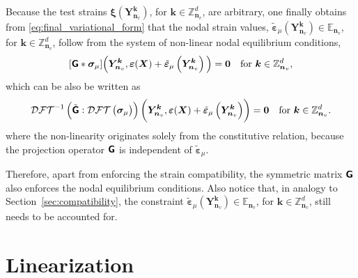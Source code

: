 Because the test strains \(\bm \xi(\bm Y_{\bm n_v}^{\bm k})\), for \(\bm k\in \mathbb Z^{d}_{\bm n_v}\), are arbitrary, one finally obtains from \eqref{eq:final_variational_form} that the nodal strain values, \(\tilde{\bm\varepsilon}_\mu(\bm Y_{\bm n_v}^{\bm k}) \in \mathbb{E}_{\bm n_v}\), for \(\bm k\in \mathbb Z^{d}_{\bm n_v}\), follow from the system of non-linear nodal equilibrium conditions,
\begin{equation} \label{eq:final_form_sum}
[\boldsymbol{\mathsf{G}} * \bm\sigma_\mu]\Big(\bm Y_{\bm n_v}^{\bm k}, \bm \varepsilon(\bm X)+\tilde{\bm \varepsilon}_\mu \left(\bm Y_{\bm n_v}^{\bm  k}\right)\Big)=\bm 0\quad \text{for \( \bm k \in \mathbb Z^d_{\bm n_v}\)},
\end{equation}
which can be also be written as
\begin{equation} \label{eq:non_linear_equilibrium_equations}
\mathcal{DFT}^{-1}\left(\tilde{\boldsymbol{\mathsf{G}}}:\mathcal{DFT}\left(\bm \sigma_\mu\right)\right)\left(\bm{Y}_{\bm n_v}^{\bm  k}, \bm \varepsilon(\bm X)+\tilde{\bm \varepsilon}_\mu \left(\bm Y_{\bm n_v}^{\bm  k}\right)\right)= \bm 0\quad \text{for \(\bm k \in \mathbb Z^d_{\bm n_v}\)}.
\end{equation}
where the non-linearity originates solely from the constitutive relation, because the projection operator \(\boldsymbol{\mathsf{G}}\) is independent of \(\tilde{\bm\varepsilon}_\mu\).

Therefore, apart from enforcing the strain compatibility, the symmetric matrix \(\boldsymbol{\mathsf{G}}\) also enforces the nodal equilibrium conditions.
Also notice that, in analogy to Section~\ref{sec:compatibility}, the constraint \(\tilde{\bm\varepsilon}_\mu(\bm Y_{\bm n_v}^{\bm k}) \in \mathbb{E}_{\bm n_v}\), for \(\bm k\in \mathbb Z^{d}_{\bm n_v}\), still needs to be accounted for.

\section{Linearization} \label{sec:linearization}

